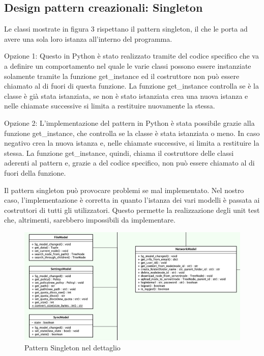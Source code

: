 \subsection{Design pattern creazionali: Singleton}

Le classi mostrate in figura 3 rispettano il pattern singleton, il che le porta ad avere una sola loro istanza all'interno del programma.
\newline{}

Opzione 1:
Questo in Python è stato realizzato tramite del codice specifico che va a definire un comportamento nel quale le varie classi possono essere instanziate solamente tramite la funzione get\_instance ed il costruttore non può essere chiamato al di fuori di questa funzione. La funzione get\_instance controlla se è la classe è già stata istanziata, se non è stato istanziata crea una nuova istanza e nelle chiamate successive si limita a restituire nuovamente la stessa.\newline{}

Opzione 2:
L'implementazione del pattern in Python è stata possibile grazie alla funzione get\_instance, che controlla se la classe è stata istanziata o meno. In caso negativo crea la nuova istanza e, nelle chiamate successive, si limita a restituire la stessa. La funzione get\_instance, quindi, chiama il costruttore delle classi aderenti al pattern e, grazie a del codice specifico, non può essere chiamato al di fuori della funzione.
\newline{}

Il pattern singleton può provocare problemi se mal implementato. Nel nostro caso, l'implementazione è corretta in quanto l'istanza dei vari modelli è passata ai costruttori di tutti gli utilizzatori. Questo permette la realizzazione degli unit test che, altrimenti, sarebbero impossibili da implementare. 
\begin{figure}[H]
    \centering
    \includegraphics[scale = 0.43]{components/img/singleton-model.png}
    \caption{Pattern Singleton nel dettaglio}
    \label{fig:Diagramma del pattern singleton}
\end{figure}
